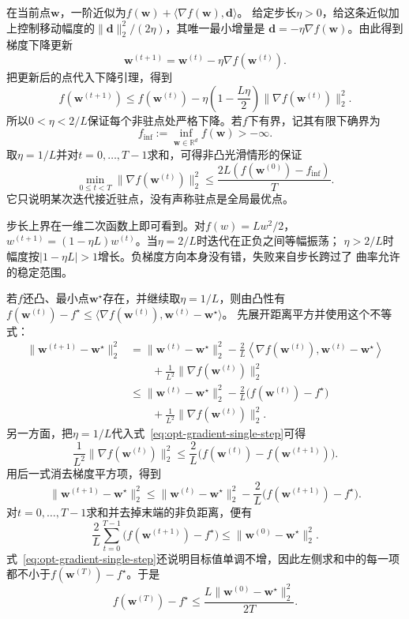 在当前点$\bm w$，一阶近似为$f(\bm w)+\langle\nabla f(\bm w),\bm d\rangle$。
给定步长$\eta>0$，给这条近似加上控制移动幅度的$\|\bm d\|_2^2/(2\eta)$，其唯一最小增量是
$\bm d=-\eta\nabla f(\bm w)$。由此得到梯度下降更新
\begin{equation}
  \bm{w}^{(t+1)}
  =\bm{w}^{(t)}-\eta\nabla f(\bm{w}^{(t)}).
  \label{eq:opt-gradient-descent}
\end{equation}
把更新后的点代入下降引理，得到
\begin{equation}
  f(\bm{w}^{(t+1)})
  \leq f(\bm{w}^{(t)})
  -\eta\left(1-\frac{L\eta}{2}\right)
  \lVert\nabla f(\bm{w}^{(t)})\rVert_2^2.
  \label{eq:opt-gradient-single-step}
\end{equation}
所以$0<\eta<2/L$保证每个非驻点处严格下降。若$f$下有界，记其有限下确界为
\[
  f_{\inf}:=\inf_{\bm{w}\in\mathbb{R}^d}f(\bm{w})>-\infty.
\]
取$\eta=1/L$并对$t=0,\ldots,T-1$求和，可得非凸光滑情形的保证
\begin{equation}
  \min_{0\leq t<T}\lVert\nabla f(\bm{w}^{(t)})\rVert_2^2
  \leq
  \frac{2L(f(\bm{w}^{(0)})-f_{\inf})}{T}.
  \label{eq:opt-nonconvex-gradient-rate}
\end{equation}
它只说明某次迭代接近驻点，没有声称驻点是全局最优点。

步长上界在一维二次函数上即可看到。对$f(w)=Lw^2/2$，
$w^{(t+1)}=(1-\eta L)w^{(t)}$。当$\eta=2/L$时迭代在正负之间等幅振荡；
$\eta>2/L$时幅度按$|1-\eta L|>1$增长。负梯度方向本身没有错，失败来自步长跨过了
曲率允许的稳定范围。

若$f$还凸、最小点$\bm{w}^{\star}$存在，并继续取$\eta=1/L$，则由凸性有
$f(\bm{w}^{(t)})-f^\star
\leq\langle\nabla f(\bm{w}^{(t)}),\bm{w}^{(t)}-\bm{w}^{\star}\rangle$。
先展开距离平方并使用这个不等式：
\begin{align*}
  \lVert\bm{w}^{(t+1)}-\bm{w}^{\star}\rVert_2^2
  &=
  \lVert\bm{w}^{(t)}-\bm{w}^{\star}\rVert_2^2
  -\frac{2}{L}
  \left\langle\nabla f(\bm{w}^{(t)}),
  \bm{w}^{(t)}-\bm{w}^{\star}\right\rangle\\
  &\qquad
  +\frac{1}{L^2}\lVert\nabla f(\bm{w}^{(t)})\rVert_2^2\\
  &\leq
  \lVert\bm{w}^{(t)}-\bm{w}^{\star}\rVert_2^2
  -\frac{2}{L}\bigl(f(\bm{w}^{(t)})-f^\star\bigr)\\
  &\qquad
  +\frac{1}{L^2}\lVert\nabla f(\bm{w}^{(t)})\rVert_2^2.
\end{align*}
另一方面，把$\eta=1/L$代入式~\eqref{eq:opt-gradient-single-step}可得
\[
  \frac{1}{L^2}\lVert\nabla f(\bm{w}^{(t)})\rVert_2^2
  \leq
  \frac{2}{L}\bigl(
  f(\bm{w}^{(t)})-f(\bm{w}^{(t+1)})\bigr).
\]
用后一式消去梯度平方项，得到
\[
  \lVert\bm{w}^{(t+1)}-\bm{w}^{\star}\rVert_2^2
  \leq
  \lVert\bm{w}^{(t)}-\bm{w}^{\star}\rVert_2^2
  -\frac{2}{L}\bigl(f(\bm{w}^{(t+1)})-f^\star\bigr).
\]
对$t=0,\ldots,T-1$求和并去掉末端的非负距离，便有
\[
  \frac{2}{L}\sum_{t=0}^{T-1}
  \bigl(f(\bm{w}^{(t+1)})-f^\star\bigr)
  \leq
  \lVert\bm{w}^{(0)}-\bm{w}^{\star}\rVert_2^2.
\]
式~\eqref{eq:opt-gradient-single-step}还说明目标值单调不增，因此左侧求和中的每一项
都不小于$f(\bm{w}^{(T)})-f^\star$。于是
\begin{equation}
  f(\bm{w}^{(T)})-f^\star
  \leq\frac{L\lVert\bm{w}^{(0)}-\bm{w}^{\star}\rVert_2^2}{2T}.
  \label{eq:opt-convex-gradient-rate}
\end{equation}

